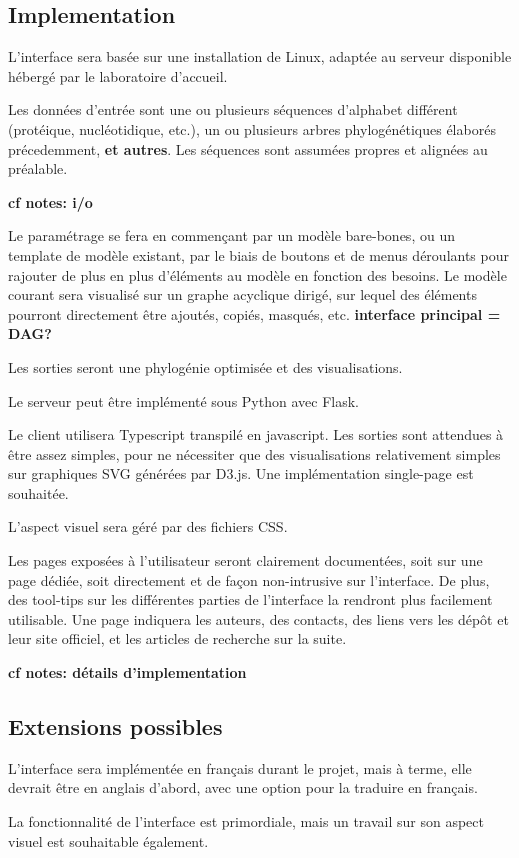 \subsection{Implementation}

L'interface sera basée sur une installation de Linux,
adaptée au serveur disponible hébergé par le laboratoire d'accueil.

Les données d'entrée sont une ou plusieurs séquences d'alphabet différent
(protéique, nucléotidique, etc.),
un ou plusieurs arbres phylogénétiques élaborés précedemment,
\textbf{et autres}.
Les séquences sont assumées propres et alignées au préalable.

\textbf{cf notes: i/o}

Le paramétrage se fera en commençant par un modèle bare-bones,
ou un template de modèle existant,
par le biais de boutons et de menus déroulants
pour rajouter de plus en plus d'éléments au modèle
en fonction des besoins.
Le modèle courant sera visualisé sur un graphe acyclique dirigé,
sur lequel des éléments pourront directement être ajoutés,
copiés, masqués, etc.
\textbf{interface principal = DAG?}

Les sorties seront une phylogénie optimisée
et des visualisations.

Le serveur peut être implémenté sous Python avec Flask.

Le client utilisera Typescript transpilé en javascript.
Les sorties sont attendues à être assez simples,
pour ne nécessiter que des visualisations relativement simples
sur graphiques SVG générées par D3.js.
Une implémentation single-page est souhaitée.

L'aspect visuel sera géré par des fichiers CSS.

Les pages exposées à l'utilisateur seront clairement documentées,
soit sur une page dédiée,
soit directement et de façon non-intrusive sur l'interface.
De plus, des tool-tips sur les différentes parties de l'interface
la rendront plus facilement utilisable.
Une page indiquera les auteurs, des contacts,
des liens vers les dépôt et leur site officiel,
et les articles de recherche sur la suite.

\textbf{cf notes: détails d'implementation}


\subsection{Extensions possibles}

L'interface sera implémentée en français durant le projet,
mais à terme, elle devrait être en anglais d'abord,
avec une option pour la traduire en français.

La fonctionnalité de l'interface est primordiale,
mais un travail sur son aspect visuel est souhaitable également.
